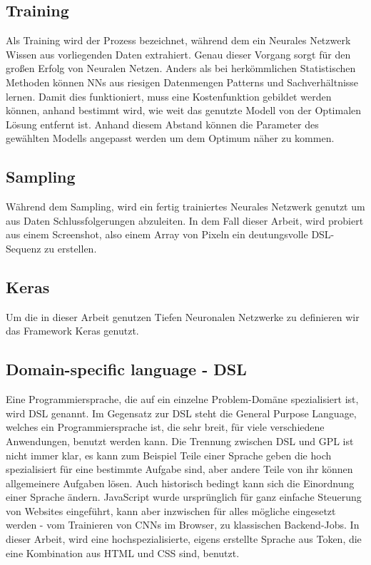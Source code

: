 \documentclass[pdftex,a4paper,halfparskip]{scrartcl}
\begin{document}
\subsection{Training}

Als Training wird der Prozess bezeichnet, während dem ein Neurales Netzwerk Wissen aus vorliegenden Daten extrahiert. Genau dieser Vorgang sorgt für den großen Erfolg von Neuralen Netzen. Anders als bei herkömmlichen Statistischen Methoden können NNs aus riesigen Datenmengen Patterns und Sachverhältnisse lernen. Damit dies funktioniert, muss eine Kostenfunktion gebildet werden können, anhand bestimmt wird, wie weit das genutzte Modell von der Optimalen Lösung entfernt ist. Anhand diesem Abstand können die Parameter des gewählten Modells angepasst werden um dem Optimum näher zu kommen.

\subsection{Sampling}
Während dem Sampling, wird ein fertig trainiertes Neurales Netzwerk genutzt um aus Daten Schlussfolgerungen abzuleiten. In dem Fall dieser Arbeit, wird probiert aus einem Screenshot, also einem Array von Pixeln ein deutungsvolle DSL-Sequenz zu erstellen.

\subsection{Keras}
Um die in dieser Arbeit genutzen Tiefen Neuronalen Netzwerke zu definieren wir das Framework Keras genutzt.

\subsection{Domain-specific language - DSL}

Eine Programmiersprache, die auf ein einzelne Problem-Domäne spezialisiert ist, wird DSL genannt. Im Gegensatz zur DSL steht die General Purpose Language, welches ein Programmiersprache ist, die sehr breit, für viele verschiedene Anwendungen, benutzt werden kann. Die Trennung zwischen DSL und GPL ist nicht immer klar, es kann zum Beispiel Teile einer Sprache geben die hoch spezialisiert für eine bestimmte Aufgabe sind, aber andere Teile von ihr können allgemeinere Aufgaben lösen. Auch historisch bedingt kann sich die Einordnung einer Sprache ändern. JavaScript wurde ursprünglich für ganz einfache Steuerung von Websites eingeführt, kann aber inzwischen für alles mögliche eingesetzt werden - vom Trainieren von CNNs im Browser, zu klassischen Backend-Jobs. 
In dieser Arbeit, wird eine hochspezialisierte, eigens erstellte Sprache aus Token, die eine Kombination aus HTML und CSS sind, benutzt.
\end{document}
